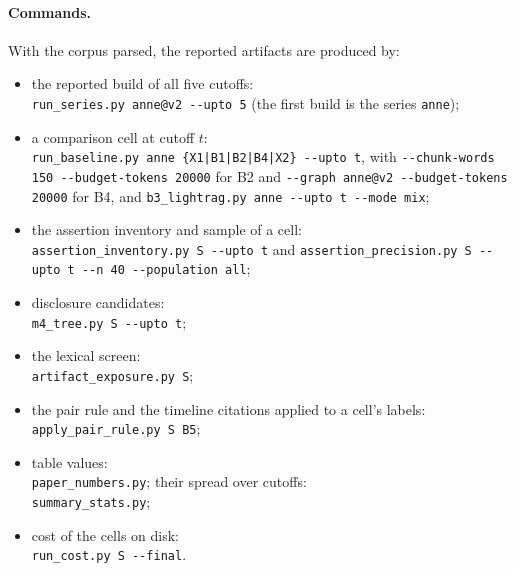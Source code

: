 \paragraph{Commands.} With the corpus parsed, the reported artifacts are produced by:
\begin{itemize}[leftmargin=*,itemsep=1pt,topsep=2pt]
  \raggedright
  \item the reported \sys build of all five cutoffs:\\ \texttt{\small run\_series.py anne@v2 -{}-upto 5}
    (the first build is the series \texttt{\small anne});
  \item a comparison cell at cutoff $t$:\\ \texttt{\small run\_baseline.py anne \{X1|B1|B2|B4|X2\} -{}-upto t},
    with \texttt{\small -{}-chunk-words 150 -{}-budget-tokens 20000} for B2 and
    \texttt{\small -{}-graph anne@v2 -{}-budget-tokens 20000} for B4, and
    \texttt{\small b3\_lightrag.py anne -{}-upto t -{}-mode mix};
  \item the assertion inventory and sample of a cell:\\ \texttt{\small assertion\_inventory.py S -{}-upto t} and
    \texttt{\small assertion\_precision.py S -{}-upto t -{}-n 40 -{}-population all};
  \item disclosure candidates:\\ \texttt{\small m4\_tree.py S -{}-upto t};
  \item the lexical screen:\\ \texttt{\small artifact\_exposure.py S};
  \item the pair rule and the timeline citations applied to a cell's labels:\\ \texttt{\small apply\_pair\_rule.py S B5};
  \item table values:\\ \texttt{\small paper\_numbers.py}; their spread over cutoffs:\\ \texttt{\small summary\_stats.py};
  \item cost of the cells on disk:\\ \texttt{\small run\_cost.py S -{}-final}.
\end{itemize}

